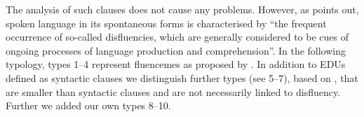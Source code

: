 
\noindent The analysis of such clauses does not cause any problems. However, as \citet[38]{Crible16} points out, spoken language in its spontaneous forms is characterised by “the frequent occurrence of so-called disfluencies, which are generally considered to be cues of ongoing processes of language production and comprehension”. In the following typology, types 1--4 represent fluencemes as proposed by \citet{Crible18}. In addition to EDUs defined as syntactic clauses we distinguish further types (see 5--7), based on \citet{KibrikPodlesskaya06}, that are smaller than syntactic clauses and are not necessarily linked to disfluency. Further we added our own types 8--10.


